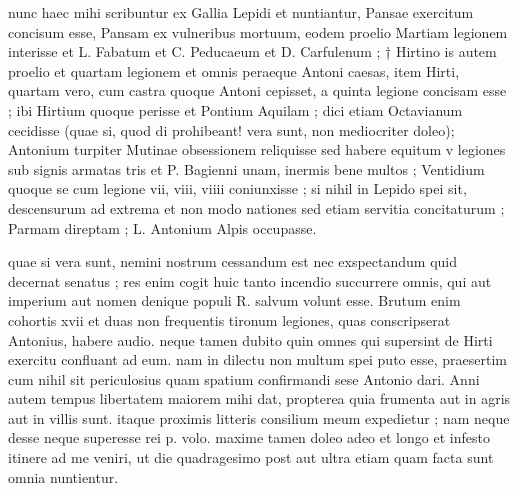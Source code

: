  nunc haec mihi scribuntur ex Gallia Lepidi et nuntiantur, Pansae exercitum concisum esse, Pansam ex vulneribus mortuum, eodem proelio Martiam legionem interisse et L. Fabatum et C. Peducaeum et D. Carfulenum ; † Hirtino is autem proelio et quartam legionem et omnis peraeque Antoni caesas, item Hirti, quartam vero, cum castra quoque Antoni cepisset, a quinta legione concisam esse ; ibi Hirtium quoque perisse et Pontium Aquilam ; dici etiam Octavianum cecidisse (quae si, quod di prohibeant! vera sunt, non mediocriter doleo); Antonium turpiter Mutinae obsessionem reliquisse sed habere equitum v legiones sub signis armatas tris et P. Bagienni unam, inermis bene multos ; Ventidium quoque se cum legione vii, viii, viiii coniunxisse ; si nihil in Lepido spei sit, descensurum ad extrema et non modo nationes sed etiam servitia concitaturum ; Parmam direptam ; L. Antonium Alpis occupasse.

 quae si vera sunt, nemini nostrum cessandum est nec exspectandum quid decernat senatus ; res enim cogit huic tanto incendio succurrere omnis, qui aut imperium aut nomen denique populi R. salvum volunt esse. Brutum enim cohortis xvii et duas non frequentis tironum legiones, quas conscripserat Antonius, habere audio. neque tamen dubito quin omnes qui supersint de Hirti exercitu confluant ad eum. nam in dilectu non multum spei puto esse, praesertim cum nihil sit periculosius quam spatium confirmandi sese Antonio dari. Anni autem tempus libertatem maiorem mihi dat, propterea quia frumenta aut in agris aut in villis sunt. itaque proximis litteris consilium meum expedietur ; nam neque desse neque superesse rei p. volo. maxime tamen doleo adeo et longo et infesto itinere ad me veniri, ut die quadragesimo post aut ultra etiam quam facta sunt omnia nuntientur.
